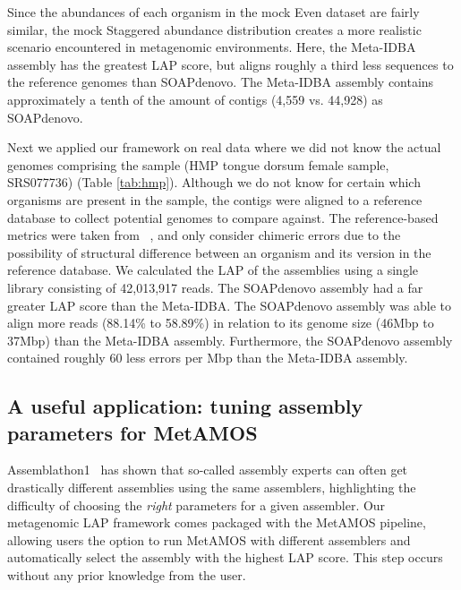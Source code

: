 \documentclass[conference]{IEEEtran}
\begin{document}
Since the abundances of each organism in the mock Even dataset are fairly similar, the mock Staggered abundance distribution creates a more realistic scenario encountered in metagenomic environments.
Here, the Meta-IDBA assembly has the greatest LAP score, but aligns roughly a third less sequences to the reference genomes than SOAPdenovo.
The Meta-IDBA assembly contains approximately a tenth of the amount of contigs (4,559 vs. 44,928) as SOAPdenovo.

Next we applied our framework on real data where we did not know the actual genomes comprising the sample (HMP tongue dorsum female sample, SRS077736) (Table \ref{tab:hmp}).
Although we do not know for certain which organisms are present in the sample, the contigs were aligned to a reference database to collect potential genomes to compare against.
The reference-based metrics were taken from ~\cite{treangen2013metamos}, and only consider chimeric errors due to the possibility of structural difference between an organism and its version in the reference database.
We calculated the LAP of the assemblies using a single library consisting of 42,013,917 reads.
The SOAPdenovo assembly had a far greater LAP score than the Meta-IDBA.
The SOAPdenovo assembly was able to align more reads (88.14\% to 58.89\%) in relation to its genome size (46Mbp to 37Mbp) than the Meta-IDBA assembly.
Furthermore, the SOAPdenovo assembly contained roughly 60 less errors per Mbp than the Meta-IDBA assembly.



\subsection{A useful application: tuning assembly parameters for MetAMOS}
Assemblathon1~\cite{earl2011assemblathon} has shown that so-called assembly experts can often get drastically different assemblies using the same assemblers, highlighting the difficulty of choosing the \emph{right} parameters for a given assembler.
Our metagenomic LAP framework comes packaged with the MetAMOS pipeline, allowing users the option to run MetAMOS with different assemblers and automatically select the assembly with the highest LAP score.
This step occurs without any prior knowledge from the user.
\end{document}
